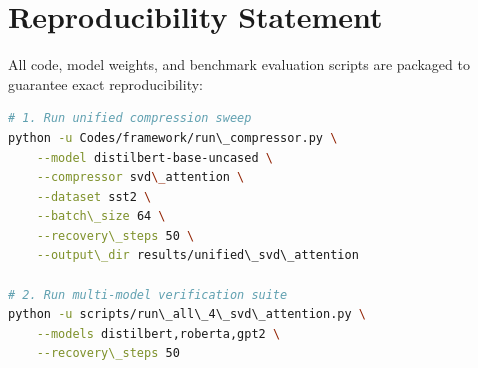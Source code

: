 \section{Reproducibility Statement}
All code, model weights, and benchmark evaluation scripts are packaged to guarantee exact reproducibility:
\begin{lstlisting}[language=bash]
# 1. Run unified compression sweep
python -u Codes/framework/run\_compressor.py \
    --model distilbert-base-uncased \
    --compressor svd\_attention \
    --dataset sst2 \
    --batch\_size 64 \
    --recovery\_steps 50 \
    --output\_dir results/unified\_svd\_attention

# 2. Run multi-model verification suite
python -u scripts/run\_all\_4\_svd\_attention.py \
    --models distilbert,roberta,gpt2 \
    --recovery\_steps 50
\end{lstlisting}
